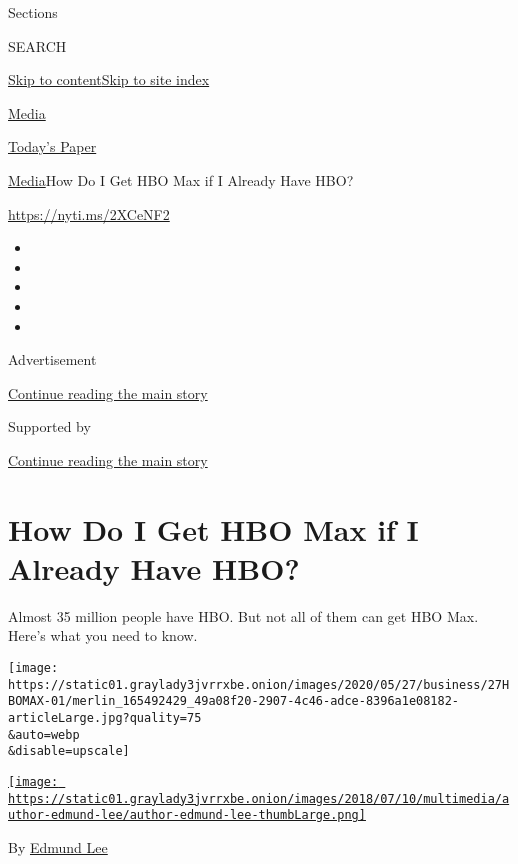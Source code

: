 Sections

SEARCH

\protect\hyperlink{site-content}{Skip to
content}\protect\hyperlink{site-index}{Skip to site index}

\href{https://www.nytimes3xbfgragh.onion/section/business/media}{Media}

\href{https://myaccount.nytimes3xbfgragh.onion/auth/login?response_type=cookie\&client_id=vi}{}

\href{https://www.nytimes3xbfgragh.onion/section/todayspaper}{Today's
Paper}

\href{/section/business/media}{Media}\textbar{}How Do I Get HBO Max if I
Already Have HBO?

\url{https://nyti.ms/2XCeNF2}

\begin{itemize}
\item
\item
\item
\item
\item
\end{itemize}

Advertisement

\protect\hyperlink{after-top}{Continue reading the main story}

Supported by

\protect\hyperlink{after-sponsor}{Continue reading the main story}

\hypertarget{how-do-i-get-hbo-max-if-i-already-have-hbo}{%
\section{How Do I Get HBO Max if I Already Have
HBO?}\label{how-do-i-get-hbo-max-if-i-already-have-hbo}}

Almost 35 million people have HBO. But not all of them can get HBO Max.
Here's what you need to know.

\texttt{[image: https://static01.graylady3jvrrxbe.onion/images/2020/05/27/business/27HBOMAX-01/merlin\_165492429\_49a08f20-2907-4c46-adce-8396a1e08182-articleLarge.jpg?quality=75\\\&auto=webp\\\&disable=upscale]}

\href{https://www.nytimes3xbfgragh.onion/by/edmund-lee}{\texttt{[image: https://static01.graylady3jvrrxbe.onion/images/2018/07/10/multimedia/author-edmund-lee/author-edmund-lee-thumbLarge.png]}}

By \href{https://www.nytimes3xbfgragh.onion/by/edmund-lee}{Edmund Lee}

